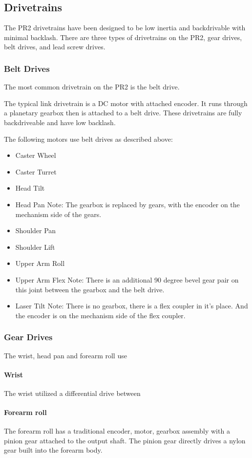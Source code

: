 \subsection{Drivetrains}
The PR2 drivetrains have been designed to be low inertia and
backdrivable with minimal backlash. There are three types of
drivetrains on the PR2, gear drives, belt drives, and lead screw
drives.  

\subsubsection{Belt Drives}
The most common drivetrain on the PR2 is the belt drive.  

The typical link drivetrain is a DC motor with attached encoder.  It
runs through a planetary gearbox then is attached to a belt
drive. These drivetrains are fully backdriveable and have low
backlash.

The following motors use belt drives as described above:
\begin{itemize}
\item Caster Wheel
\item Caster Turret
\item Head Tilt
\item Head Pan
\subitem Note: The gearbox is replaced by gears, with the encoder on the mechanism side of the gears.  
\item Shoulder Pan
\item Shoulder Lift
\item Upper Arm Roll
\item Upper Arm Flex
\subitem Note: There is an additional 90 degree bevel gear pair on this joint between the gearbox and the belt drive. 
\item Laser Tilt
\subitem Note: There is no gearbox, there is a flex coupler in it's place.  And the encoder is on the mechanism side of the flex coupler.
\end{itemize}


\subsubsection{Gear Drives}
The wrist, head pan and forearm roll use 
\paragraph{Wrist }
The wrist utilized a differential drive between 

\paragraph{Forearm roll }
The forearm roll has a traditional encoder, motor, gearbox assembly
with a pinion gear attached to the output shaft.  The pinion gear
directly drives a nylon gear built into the forearm body.

